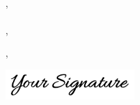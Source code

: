 \documentclass[12pt]{letter}
\begin{document}
  \PlaceHeader

  \begin{center}
    {
      \fontsize{28}{0}\selectfont\scshape \Name
    } \\[0.5cm]

    \faEnvelope\enspace \Email \hfill
    \faPhone\enspace \Phone \hfill
    \faMapMarker\enspace \Location

  \end{center}

  \vspace{0.5cm}

  \Date \\

  \vspace{-0.5cm}
  \Company \\
  \Street \\
  \City, \State\, \Zip \\

  \Object \\

  \Recipient, \\

  \setlength\parindent{24pt}
  

  \vfill

  \begin{flushleft}
    \Closer,
    
    \includegraphics[width=5cm]{figs/signature.png}

  \end{flushleft}
\end{document}
